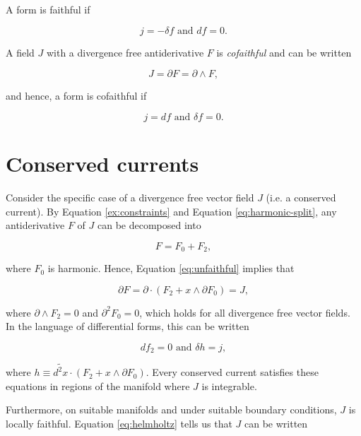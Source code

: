 \documentclass[twocolumn]{article}
\begin{document}
A form is faithful if

\begin{equation}
  j = - \delta f \text { and } df = 0.
\end{equation}

A field $J$ with a divergence free antiderivative $F$ is \emph{cofaithful} and can be written

\begin{equation}
  J = \partial F = \partial \wedge F,
\end{equation}

and hence, a form is cofaithful if

\begin{equation}
  j = df \text{ and } \delta f = 0.
\end{equation}

\section{Conserved currents}

Consider the specific case of a divergence free vector field $J$ (i.e. a conserved current). By Equation \ref{ex:constraints} and Equation \ref{eq:harmonic-split}, any antiderivative $F$ of $J$ can be decomposed into 

\begin{equation}
  F = F_0 + F_2,
\end{equation}

where $F_0$ is harmonic. Hence, Equation \ref{eq:unfaithful} implies that

\begin{equation}
  \partial F = \partial \cdot (F_2 + x \wedge \partial F_0) = J, \label{eq:coexact}
\end{equation}

where $\partial \wedge F_2 = 0$ and $\partial^2 F_0 = 0$, which holds for all divergence free vector fields. In the language of differential forms, this can be written

\begin{equation}
  d f_2 = 0 \text{ and } \delta h = j,
\end{equation}

where $h \equiv \widetilde{d^{2}x} \cdot (F_2 + x \wedge \partial F_0)$. Every conserved current satisfies these equations in regions of the manifold where $J$ is integrable.

Furthermore, on suitable manifolds and under suitable boundary conditions, $J$ is locally faithful. Equation \ref{eq:helmholtz} tells us that $J$ can be written
\end{document}
